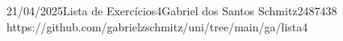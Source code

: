 \documentclass{article}
\begin{document}
{21/04/2025}{Lista de Exercícios}{4}{Gabriel dos Santos Schmitz}{2487438}
{https://github.com/gabrielzschmitz/uni/tree/main/ga/lista4}





\newpage
\printbibliography\
\end{document}

